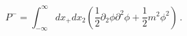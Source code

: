 \begin{equation}
P^-=\int_{-\infty} ^\infty dx_+dx_2 (\frac{1}{2}\partial_2 \phi \partial^2
\phi  +\frac{1}{2}m^2 \phi^2)\,.
\end{equation}

